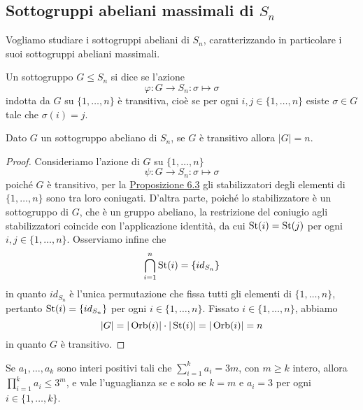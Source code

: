 \documentclass[11pt]{scrartcl}
\begin{document}
\subsection{Sottogruppi abeliani massimali di $S_n$}

Vogliamo studiare i sottogruppi abeliani di $S_n$, caratterizzando in particolare
i suoi sottogruppi abeliani massimali.

\begin{definition}
    Un sottogruppo $G\leqslant S_n$ si dice  se l'azione
    \[
        \varphi: G\longrightarrow S_n :\sigma \longmapsto \sigma
    \]indotta da $G$ su $\{1, \ldots, n\}$ è transitiva, cioè se per ogni
    $i, j \in \{1, \ldots, n\}$ esiste $\sigma \in G$ tale che $\sigma(i) = j$.
\end{definition}

\begin{lemma}
    \label{lemma3.0}
    Dato $G$ un sottogruppo abeliano di $S_n$, se $G$ è transitivo allora $|G| = n$.
\end{lemma}

\begin{proof}
    Consideriamo l'azione di $G$ su $\{1, \ldots, n\}$
    \[
        \psi : G\longrightarrow S_n :\sigma \longmapsto \sigma
    \]
    poiché $G$ è transitivo, per la \hyperref[prop1.0]{Proposizione 6.3}
    gli stabilizzatori degli elementi di $\{1, \ldots, n\}$ sono tra loro coniugati.
    D'altra parte, poiché lo stabilizzatore è un sottogruppo di $G$, che
    è un gruppo abeliano, la restrizione del coniugio agli
    stabilizzatori coincide con l'applicazione identità, da cui $\operatorname{St}(i) = \operatorname{St}(j)$
    per ogni $i, j \in \{1, \ldots, n\}$. Osserviamo infine che 
    \[
        \bigcap_{i = 1}^n \operatorname{St}(i) = \{id_{S_n}\}
    \]in quanto $id_{S_n}$ è l'unica permutazione che fissa tutti gli elementi
    di $\{1, \ldots, n\}$, pertanto $\operatorname{St}(i) = \{id_{S_n}\}$ per ogni $i \in \{1, \ldots, n\}$.
    Fissato $i \in \{1, \ldots, n\}$, abbiamo 
    \[
        |G| = |\operatorname{Orb}(i)|\cdot|\operatorname{St}(i)| = |\operatorname{Orb}(i)| = n
    \]
    in quanto $G$ è transitivo.
\end{proof}

\begin{lemma}
    \label{lemma4.0}
    Se $a_1, \ldots, a_k$ sono interi positivi tali che $\displaystyle
    \sum_{i = 1}^k a_i = 3m$,
    con $m \geqslant k$ intero, allora $\displaystyle
        \prod_{i = 1}^k a_i \leq 3^m$, 
        e vale l'uguaglianza se e solo se $k = m$ e $a_i = 3$ per ogni $i \in \{1, \ldots, k\}$.
\end{lemma}
\end{document}
